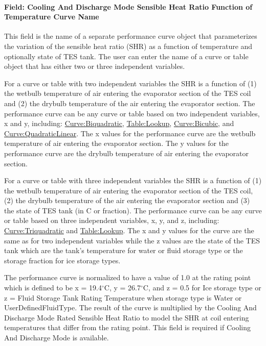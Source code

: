 \paragraph{Field: Cooling And Discharge Mode Sensible Heat Ratio Function of Temperature Curve Name}\label{field-cooling-and-discharge-mode-sensible-heat-ratio-function-of-temperature-curve-name}

This field is the name of a separate performance curve object that parameterizes the variation of the sensible heat ratio (SHR) as a function of temperature and optionally state of TES tank. The user can enter the name of a curve or table object that has either two or three independent variables.

For a curve or table with two independent variables the SHR is a function of (1) the wetbulb temperature of air entering the evaporator section of the TES coil and (2) the drybulb temperature of the air entering the evaporator section. The performance curve can be any curve or table based on two independent variables, x and y, including: \hyperref[curvebiquadratic]{Curve:Biquadratic}, \hyperref[tablelookup]{Table:Lookup}, \hyperref[curvebicubic]{Curve:Bicubic}, and \hyperref[curvequadraticlinear]{Curve:QuadraticLinear}. The x values for the performance curve are the wetbulb temperature of air entering the evaporator section. The y values for the performance curve are the drybulb temperature of air entering the evaporator section.

For a curve or table with three independent variables the SHR is a function of (1) the wetbulb temperature of air entering the evaporator section of the TES coil, (2) the drybulb temperature of the air entering the evaporator section and (3) the state of TES tank (in C or fraction). The performance curve can be any curve or table based on three independent variables, x, y, and z, including: \hyperref[curvetriquadratic]{Curve:Triquadratic} and \hyperref[tablelookup]{Table:Lookup}. The x and y values for the curve are the same as for two independent variables while the z values are the state of the TES tank which are the tank's temperature for water or fluid storage type or the storage fraction for ice storage types.

The performance curve is normalized to have a value of 1.0 at the rating point which is defined to be x = 19.4$^\circ$C, y = 26.7$^\circ$C, and z = 0.5 for Ice storage type or z = Fluid Storage Tank Rating Temperature when storage type is Water or UserDefinedFluidType. The result of the curve is multiplied by the Cooling And Discharge Mode Rated Sensible Heat Ratio to model the SHR at coil entering temperatures that differ from the rating point. This field is required if Cooling And Discharge Mode is available.

